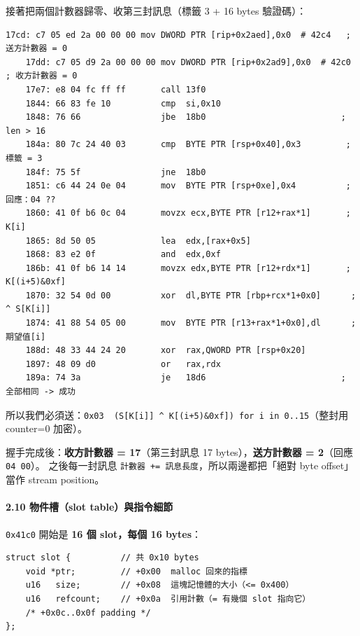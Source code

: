 \documentclass[10pt,a4paper]{article}
\begin{document}
接著把兩個計數器歸零、收第三封訊息（標籤 3 + 16 bytes 驗證碼）：

\begin{Verbatim}[breaklines=true,breakanywhere=true,breakautoindent=false,fontsize=\fontsize{7.0}{9.5}\selectfont]
    17cd: c7 05 ed 2a 00 00 00 mov DWORD PTR [rip+0x2aed],0x0  # 42c4   ; 送方計數器 = 0
    17dd: c7 05 d9 2a 00 00 00 mov DWORD PTR [rip+0x2ad9],0x0  # 42c0   ; 收方計數器 = 0
    17e7: e8 04 fc ff ff       call 13f0
    1844: 66 83 fe 10          cmp  si,0x10
    1848: 76 66                jbe  18b0                           ; len > 16
    184a: 80 7c 24 40 03       cmp  BYTE PTR [rsp+0x40],0x3         ; 標籤 = 3
    184f: 75 5f                jne  18b0
    1851: c6 44 24 0e 04       mov  BYTE PTR [rsp+0xe],0x4          ; 回應：04 ?? 
    1860: 41 0f b6 0c 04       movzx ecx,BYTE PTR [r12+rax*1]       ; K[i]
    1865: 8d 50 05             lea  edx,[rax+0x5]
    1868: 83 e2 0f             and  edx,0xf
    186b: 41 0f b6 14 14       movzx edx,BYTE PTR [r12+rdx*1]       ; K[(i+5)&0xf]
    1870: 32 54 0d 00          xor  dl,BYTE PTR [rbp+rcx*1+0x0]      ; ^ S[K[i]]
    1874: 41 88 54 05 00       mov  BYTE PTR [r13+rax*1+0x0],dl      ; 期望值[i]
    188d: 48 33 44 24 20       xor  rax,QWORD PTR [rsp+0x20]
    1897: 48 09 d0             or   rax,rdx
    189a: 74 3a                je   18d6                           ; 全部相同 -> 成功
\end{Verbatim}

所以我們必須送：\texttt{0x03\ \allowbreak{}\textbar{}\allowbreak{}\textbar{}\allowbreak{}\ \allowbreak{}(S{[}K{[}i{]}{]}\ \allowbreak{}\^\allowbreak{}{}\allowbreak{}\ \allowbreak{}K{[}(i+5)\&\allowbreak{}0xf{]})\ \allowbreak{}for\ \allowbreak{}i\ \allowbreak{}in\ \allowbreak{}0..\allowbreak{}15}（整封用
counter=0 加密）。

握手完成後：\textbf{收方計數器 = 17}（第三封訊息 17
bytes），\textbf{送方計數器 = 2}（回應 \texttt{04\ \allowbreak{}00}）。
之後每一封訊息 \texttt{計數器\ \allowbreak{}+=\ \allowbreak{}訊息長度}，所以兩邊都把「絕對 byte
offset」當作 stream position。

\paragraph{2.10 物件槽（slot
table）與指令細節}\label{ux7269ux4ef6ux69fdslot-tableux8207ux6307ux4ee4ux7d30ux7bc0}

\texttt{0x41c0} 開始是 \textbf{16 個 slot，每個 16 bytes}：

\begin{Verbatim}[breaklines=true,breakanywhere=true,breakautoindent=false,fontsize=\fontsize{7.0}{9.5}\selectfont]
struct slot {          // 共 0x10 bytes
    void *ptr;         // +0x00  malloc 回來的指標
    u16   size;        // +0x08  這塊記憶體的大小（<= 0x400）
    u16   refcount;    // +0x0a  引用計數（= 有幾個 slot 指向它）
    /* +0x0c..0x0f padding */
};
\end{Verbatim}
\end{document}

